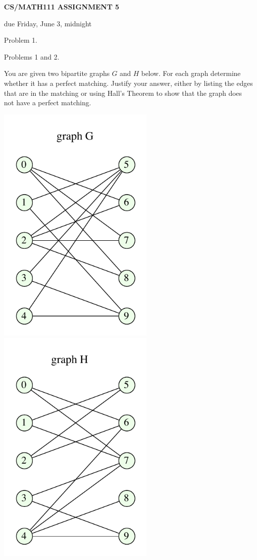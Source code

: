 \documentclass{article}
\begin{document}
\centerline{\large \bf CS/MATH111 ASSIGNMENT 5}
\centerline{due Friday, June 3, midnight}

\vskip 0.2in
 Problem 1.

 Problems 1 and 2.

\vskip 0.2in


\begin{problem}
You are given two bipartite graphs $G$ and $H$ below. For each
graph determine whether it has a perfect matching.
Justify your answer, either by 
listing the edges that are in the matching or using
Hall's Theorem to show that the graph does not have a
perfect matching.

\begin{center}
\includegraphics[width = 3in]{bipartite_graphG_hw5.pdf}
\includegraphics[width = 3in]{bipartite_graphH_hw5.pdf}
\end{center}
\end{problem}
\end{document}
